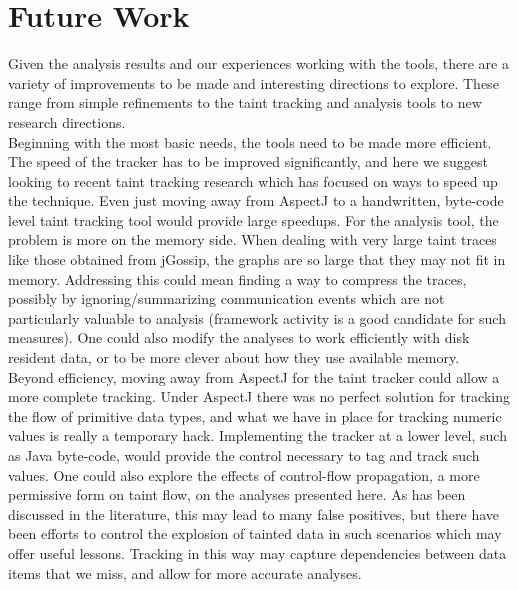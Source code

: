 \documentclass[msc,oneside]{ubcthesis}
\begin{document}
\section{Future Work}

Given the analysis results and our experiences working with the tools, there are a variety of improvements to be made and interesting directions to explore. These range from simple refinements to the taint tracking and analysis tools to new research directions.\\

Beginning with the most basic needs, the tools need to be made more efficient. The speed of the tracker has to be improved significantly, and here we suggest looking to recent taint tracking research which has focused on ways to speed up the technique. Even just moving away from AspectJ to a handwritten, byte-code level taint tracking tool would provide large speedups. For the analysis tool, the problem is more on the memory side. When dealing with very large taint traces like those obtained from jGossip, the graphs are so large that they may not fit in memory. Addressing this could mean finding a way to compress the traces, possibly by ignoring/summarizing communication events which are not particularly valuable to analysis (framework activity is a good candidate for such measures). One could also modify the analyses to work efficiently with disk resident data, or to be more clever about how they use available memory.\\

Beyond efficiency, moving away from AspectJ for the taint tracker could allow a more complete tracking. Under AspectJ there was no perfect solution for tracking the flow of primitive data types, and what we have in place for tracking numeric values is really a temporary hack. Implementing the tracker at a lower level, such as Java byte-code, would provide the control necessary to tag and track such values. One could also explore the effects of control-flow propagation, a more permissive form on taint flow, on the analyses presented here. As has been discussed in the literature, this may lead to many false positives, but there have been efforts to control the explosion of tainted data in such scenarios which may offer useful lessons. Tracking in this way may capture dependencies between data items that we miss, and allow for more accurate analyses.\\
\end{document}
